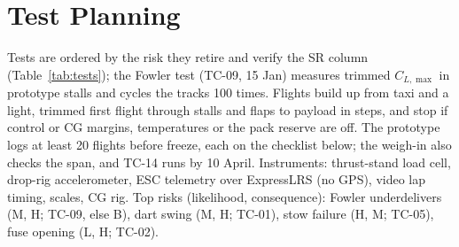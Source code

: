 \section{Test Planning}
Tests are ordered by the risk they retire and verify the SR column (Table~\ref{tab:tests}); the Fowler test (TC-09, 15 Jan) measures trimmed $C_{L,\max}$ in prototype stalls and cycles the tracks 100 times. Flights build up from taxi and a light, trimmed first flight through stalls and flaps to payload in steps, and stop if control or CG margins, temperatures or the pack reserve are off. The prototype logs at least 20 flights before freeze, each on the checklist below; the weigh-in also checks the span, and TC-14 runs by 10 April. Instruments: thrust-stand load cell, drop-rig accelerometer, ESC telemetry over ExpressLRS (no GPS), video lap timing, scales, CG rig. Top risks (likelihood, consequence): Fowler underdelivers (M, H; TC-09, else B), dart swing (M, H; TC-01), stow failure (H, M; TC-05), fuse opening (L, H; TC-02).

